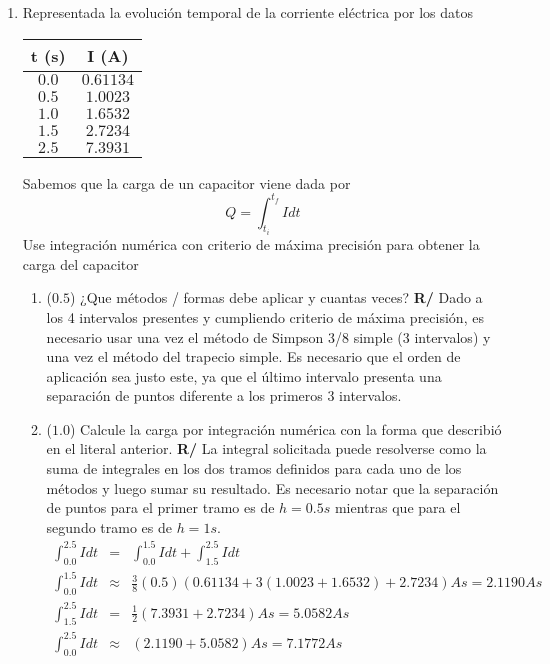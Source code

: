 \documentclass[12pt]{article}
\begin{document}
\vspace{-.5cm}
  \begin{enumerate}[leftmargin=*,widest=9]
    \item Representada la evolución temporal de la corriente eléctrica por los datos
    \begin{center}
   		\begin{tabular}{ | c | c | }
     \hline
     t (s) & I (A) \\ \hline
     $0.0$ & $0.61134$ \\ \hline
     $0.5$ & $1.0023$ \\ \hline
     $1.0$ & $1.6532$ \\ \hline
     $1.5$ & $2.7234$ \\ \hline
     $2.5$ & $7.3931$ \\
     \hline
   		\end{tabular}
 	\end{center}
   Sabemos que la carga de un capacitor viene dada por $$Q = \int_{t_i}^{t_f} I dt$$ Use integración numérica con criterio de máxima precisión para obtener la carga del capacitor
   \begin{enumerate}[label=\alph*]
    \item (\(0.5\)) ¿Que métodos / formas debe aplicar y cuantas veces?
    \textbf{R/} Dado a los 4 intervalos presentes y cumpliendo criterio de máxima precisión, es necesario usar una vez el método de Simpson 3/8 simple (3 intervalos) y una vez el método del trapecio simple. Es necesario que el orden de aplicación sea justo este, ya que el último intervalo presenta una separación de puntos diferente a los primeros 3 intervalos.
    \item (\(1.0\)) Calcule la carga por integración numérica con la forma que describió en el literal anterior.
\textbf{R/} La integral solicitada puede resolverse como la suma de integrales en los dos tramos definidos para cada uno de los métodos y luego sumar su resultado. Es necesario notar que la separación de puntos para el primer tramo es de \(h=0.5s\) mientras que para el segundo tramo es de \(h=1s\).
\begin{eqnarray*}
\int_{0.0}^{2.5}Idt &=& \int_{0.0}^{1.5}Idt + \int_{1.5}^{2.5}Idt \\
\int_{0.0}^{1.5}Idt &\approx & \frac{3}{8}(0.5)(0.61134 + 3(1.0023+1.6532)+2.7234)As = 2.1190As\\
\int_{1.5}^{2.5}Idt &=& \frac{1}{2}(7.3931+2.7234)As = 5.0582As\\
\int_{0.0}^{2.5}Idt &\approx & (2.1190+5.0582)As = 7.1772As

\end{eqnarray*}
\end{enumerate}
\end{enumerate}
\end{document}
